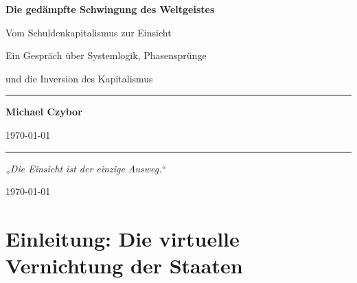 \documentclass[12pt,a4paper]{book}
\begin{document}
\begin{titlepage}
    \centering
    \vspace*{1cm}
    
    {\Huge \textbf{Die gedämpfte Schwingung des Weltgeistes}}
    
    \vspace{0.3cm}
    {\Large Vom Schuldenkapitalismus zur Einsicht}
    
    \vspace{0.5cm}
    {\large Ein Gespräch über Systemlogik, Phasensprünge}
    
    {\large und die Inversion des Kapitalismus}
    
    \vspace{2cm}
    
    \rule{0.7\textwidth}{0.4pt}
    
    \vspace{0.5cm}
    
    {\Large \textbf{Michael Czybor}}
    
    \vspace{0.3cm}
    
    {\large \today}
    
    \vspace{1cm}
    
    \rule{0.7\textwidth}{0.4pt}
    
    \vspace{0.5cm}
    
    \begin{flushright}
        \textit{„Die Einsicht ist der einzige Ausweg.“}
    \end{flushright}
    
    \vfill
    
    {\small \today}
\end{titlepage}

\tableofcontents
\newpage

\chapter{Einleitung: Die virtuelle Vernichtung der Staaten}
\end{document}
